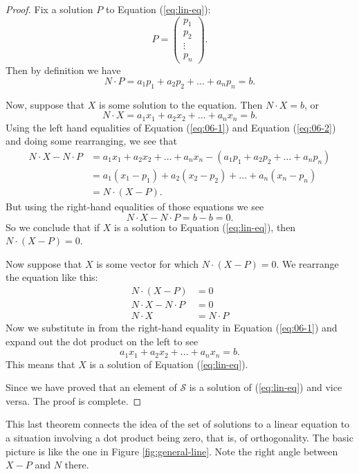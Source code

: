 \documentclass[elementsmain.tex]{subfiles}
\begin{document}
\begin{proof} Fix a solution $P$ to Equation (\ref{eq:lin-eq}):
\[
P = \begin{pmatrix} p_1 \\ p_2 \\ \vdots \\ p_n\end{pmatrix}.
\]
Then by definition we have
\begin{equation}\label{eq:06-1}
N\cdot P = a_1 p_1 + a_2 p_2 + \dots + a_n p_n = b.
\end{equation}

Now, suppose that $X$ is some solution to the equation. Then $N\cdot X=b$, or
\begin{equation}\label{eq:06-2}
N\cdot X = a_1 x_1 + a_2 x_2 + \dots + a_n x_n = b.
\end{equation}
Using the left hand equalities of Equation (\ref{eq:06-1}) and Equation (\ref{eq:06-2}) and doing some rearranging, we see that
\begin{equation*}
\begin{split}
N\cdot X - N\cdot P & = a_1 x_1 + a_2 x_2 + \dots + a_n x_n - \left(a_1 p_1 + a_2 p_2 + \dots + a_n p_n\right) \\
& = a_1(x_1- p_1) + a_2(x_2- p_2) + \dots + a_n(x_n- p_n) \\
& = N \cdot (X-P).
\end{split}
\end{equation*}
But using the right-hand equalities of those equations we see
\[
N\cdot X - N\cdot P = b- b = 0.
\]
So we conclude that if $X$ is a solution to Equation (\ref{eq:lin-eq}), then $N\cdot(X-P)=0$.

Now suppose that $X$ is some vector for which $N\cdot (X-P)=0$. We rearrange the equation like this:
\begin{align*}
N\cdot(X-P) & = 0 \\
N\cdot X - N\cdot P & = 0 \\
N\cdot X & = N\cdot P
\end{align*}
Now we substitute in from the right-hand equality in Equation (\ref{eq:06-1}) and expand out the dot product on the left to see
\[
a_1 x_1 + a_2 x_2 + \dots + a_n x_n = b.
\]
This means that $X$ is a solution of Equation (\ref{eq:lin-eq}).

Since we have proved that an element of $\mathcal{S}$ is a solution of (\ref{eq:lin-eq}) and vice versa. The proof is complete.
\end{proof}

This last theorem connects the idea of the set of solutions to a linear equation to a situation involving a dot product being zero, that is, of orthogonality. The basic picture is like the one in Figure \ref{fig:general-line}. Note the right angle between $X-P$ and $N$ there.
\end{document}
